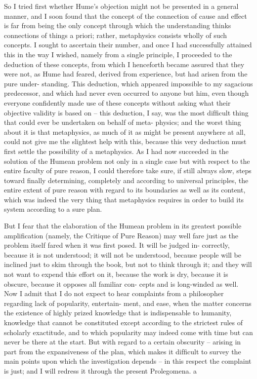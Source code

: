 So I tried ﬁrst whether Hume’s objection might not be presented in a
general manner, and I soon found that the concept of the connection of
cause and effect is far from being the only concept through which the
understanding thinks connections of things a priori; rather, metaphysics
consists wholly of such concepts. I sought to ascertain their number, and
once I had successfully attained this in the way I wished, namely from
a single principle, I proceeded to the deduction of these concepts, from
which I henceforth became assured that they were not, as Hume had
feared, derived from experience, but had arisen from the pure under-
standing. This deduction, which appeared impossible to my sagacious
predecessor, and which had never even occurred to anyone but him, even
though everyone conﬁdently made use of these concepts without asking
what their objective validity is based on – this deduction, I say, was the
most difﬁcult thing that could ever be undertaken on behalf of meta-
physics; and the worst thing about it is that metaphysics, as much of it
as might be present anywhere at all, could not give me the slightest help
with this, because this very deduction must ﬁrst settle the possibility of
a metaphysics. As I had now succeeded in the solution of the Humean
problem not only in a single case but with respect to the entire faculty of
pure reason, I could therefore take sure, if still always slow, steps toward
ﬁnally determining, completely and according to universal principles,
the entire extent of pure reason with regard to its boundaries as well as
its content, which was indeed the very thing that metaphysics requires
in order to build its system according to a sure plan.

But I fear that the elaboration of the Humean problem in its greatest
possible ampliﬁcation (namely, the Critique of Pure Reason) may well fare
just as the problem itself fared when it was ﬁrst posed. It will be judged in-
correctly, because it is not understood; it will not be understood, because
people will be inclined just to skim through the book, but not to think
through it; and they will not want to expend this effort on it, because
the work is dry, because it is obscure, because it opposes all familiar con-
cepts and is long-winded as well. Now I admit that I do not expect to hear
complaints from a philosopher regarding lack of popularity, entertain-
ment, and ease, when the matter concerns the existence of highly prized
knowledge that is indispensable to humanity, knowledge that cannot be
constituted except according to the strictest rules of scholarly exactitude,
and to which popularity may indeed come with time but can never be
there at the start. But with regard to a certain obscurity – arising in part
from the expansiveness of the plan, which makes it difﬁcult to survey the
main points upon which the investigation depends – in this respect the
complaint is just; and I will redress it through the present Prolegomena. a

